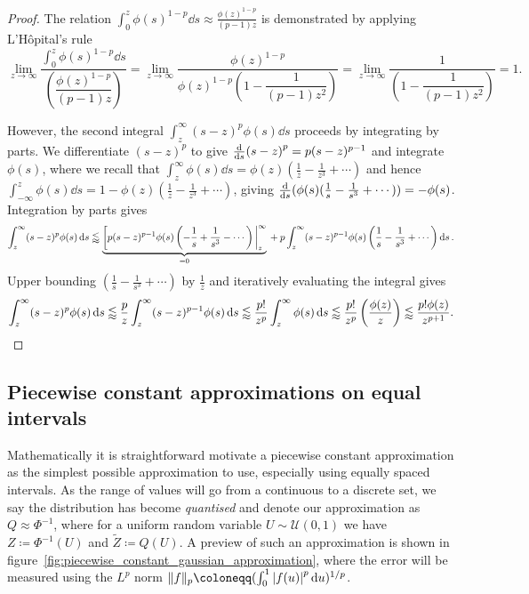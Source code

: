 \documentclass[manuscript,review]{acmart}
\begin{document}
\begin{proof}
The relation  $ \int_{0}^{z} \phi(s)^{1-p} \dd{s} \approx \tfrac{\phi(z)^{1-p}}{(p-1)z}  $ is demonstrated by applying L'H\^{o}pital's rule
\begin{equation*}
\lim_{z \to \infty} \dfrac{\int_{0}^{z} \phi(s)^{1-p} \dd{s}}{\left(\dfrac{\phi(z)^{1-p}}{(p-1)z}\right)} 
=  \lim_{z \to \infty} \dfrac{\phi(z)^{1-p}}{\phi(z)^{1-p}\left(1 - \dfrac{1}{(p-1)z^2} \right)} 
= \lim_{z \to \infty} \dfrac{1}{\left(1 - \dfrac{1}{(p-1)z^2}\right)} 
= 1.
\end{equation*}

However, the second integral $ \int_{z}^{\infty} (s-z)^p\phi(s) \dd{s} $ proceeds by integrating by parts. We differentiate $ (s-z)^p $ to give $ \dv{s} (s-z)^p = p (s-z)^{p-1} $ and integrate $ \phi(s) $, where we recall that $ \int_{z}^{\infty} \phi(s) \dd{s}  = \phi(z)(\tfrac{1}{z} - \tfrac{1}{z^3} + \cdots) $ and hence $ \int_{-\infty}^{z} \phi(s) \dd{s}  = 1 -\phi(z)(\tfrac{1}{z} - \tfrac{1}{z^3} + \cdots) $, giving $ {\dv{s}} (\phi(s)(\tfrac{1}{s} - \tfrac{1}{s^3} + \cdots))  = -\phi(s) $. Integration by parts gives
\begin{equation*}
\int_{z}^{\infty} (s-z)^p\phi(s) \dd{s} \lessapprox \underbrace{\eval[p(s-z)^{p-1}\phi(s)\left(-\dfrac{1}{s} + \dfrac{1}{s^3} - \cdots\right)|_{z}^{\infty}}_{{} = 0} {} + p \int_{z}^{\infty} (s-z)^{p-1} \phi(s) \left(\dfrac{1}{s} - \dfrac{1}{s^3} + \cdots\right) \dd{s}.
\end{equation*}
Upper bounding $ (\tfrac{1}{s} - \tfrac{1}{s^3} + \cdots )$ by $ \tfrac{1}{z} $ and iteratively evaluating the integral gives
\begin{equation*}
\int_{z}^{\infty} (s-z)^p\phi(s) \dd{s}
\lessapprox \dfrac{p}{z} \int_{z}^{\infty} (s-z)^{p-1} \phi(s) \dd{s} 
\lessapprox \dfrac{p!}{z^p} \int_{z}^{\infty} \phi(s) \dd{s} 
\lessapprox \dfrac{p!}{z^p} \left(\dfrac{\phi(z)}{z}\right) 
\lessapprox \frac{p!\phi(z)}{z^{p+1}}. \qedhere
\end{equation*}
\end{proof}

\subsection{Piecewise constant approximations on equal intervals}
\label{sec:piecewise_constant_approximations_on_equal_intervals}

Mathematically it is straightforward motivate a piecewise constant approximation as the simplest possible approximation to use, especially using equally spaced intervals. As the range of values will go from a continuous to a discrete set, we say the distribution has become \emph{quantised} and denote our approximation as $ Q \approx \Phi^{-1} $, where for a uniform random variable $ U \sim \mathcal{U}(0, 1)$ we have $ Z \coloneqq \Phi^{-1}(U) $ and $ \widetilde{Z} \coloneqq Q(U) $. A preview of such an approximation is shown in figure~\ref{fig:piecewise_constant_gaussian_approximation}, where the error will be measured using the $ L^p $ norm $ \lVert f \rVert_p \coloneqq (\int_0^1 \abs{f(u)}^p \dd{u})^{1/p} $.
\end{document}
